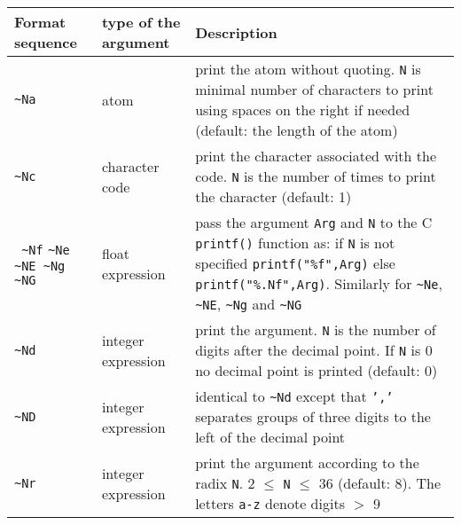 \begin{tabular}{|C{1.4cm}|C{2.8cm}|p{10.45cm}|}
\hline

Format sequence  & type of the argument & Description \\

\hline\hline

\texttt{\~{}Na} & atom & print the atom without quoting. \texttt{N} is minimal number of characters to print using spaces on the right if needed (default: the length of the atom) \\

\hline

\texttt{\~{}Nc} & character code & print the character associated with the
code. \texttt{N} is the number of times to print the character (default: 1)\\

\hline

\texttt{ \~{}Nf}
\linebreak
\texttt{\~{}Ne \~{}NE \~{}Ng \~{}NG}
               &  float expression & pass the argument \texttt{Arg} and 
                                     \texttt{N} to the C \texttt{printf()}
                                     function as: 
\linebreak
                               if \texttt{N} is not specified 
                               \texttt{printf("\%f",Arg)} else
                               \texttt{printf("\%.Nf",Arg)}.
\linebreak
Similarly for \texttt{\~{}Ne}, \texttt{\~{}NE}, \texttt{\~{}Ng} and \texttt{\~{}NG} \\ 

\hline

\texttt{\~{}Nd} & integer expression & print the argument. \texttt{N} is the
number of digits after the decimal point. If \texttt{N} is 0 no
decimal point is printed (default: 0)\\

\hline

\texttt{\~{}ND} & integer expression & identical to \texttt{\~{}Nd} except
that \texttt{','} separates groups of three digits to the left of the
decimal point \\

\hline

\texttt{\~{}Nr} & integer expression & print the argument according to the
radix \texttt{N}. 2 $\leq$ \texttt{N} $\leq$ 36 (default: 8). The letters
\texttt{a-z} denote digits $>$ 9 \\ 

\hline


\end{tabular}
